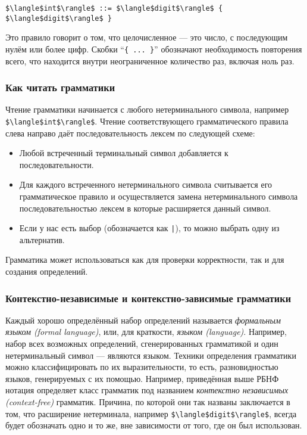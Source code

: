 \begin{lstlisting}
$\langle$int$\rangle$ ::= $\langle$digit$\rangle$ { $\langle$digit$\rangle$ }
\end{lstlisting}

Это правило говорит о том, что целочисленное --- это число, с последующим нулём или более цифр. Скобки ``\lstinline|{ ... }|'' обозначают необходимость повторения всего, что находится внутри неограниченное количество раз, включая ноль раз.

\subsubsection{Как читать грамматики}

Чтение грамматики начинается с любого нетерминального символа, например \lstinline|$\langle$int$\rangle$|. Чтение соответствующего грамматического правила слева направо даёт последовательность лексем по следующей схеме:

\begin{itemize}
\item{Любой встреченный терминальный символ добавляется к последовательности.}

\item{Для каждого встреченного нетерминального символа считывается его грамматическое правило и осуществляется замена нетерминального символа последовательностью лексем в которые расширяется данный символ.}

\item{Если у нас есть выбор (обозначается как \lstinline!|!), то можно выбрать одну из альтернатив.}
\end{itemize}

Грамматика может использоваться как для проверки корректности, так и для создания определений.

\subsubsection{Контекстно-независимые и контекстно-зависимые грамматики}

Каждый хорошо определённый набор определений называется \emph{формальным языком (formal language)}, или, для краткости, \emph{языком (language)}. Например, набор всех возможных определений, сгенерированных грамматикой и один нетерминальный символ --- являются языком. Техники определения грамматики можно классифицировать по их выразительности, то есть, разновидностью языков, генерируемых с их помощью. Например, приведённая выше РБНФ нотация определяет класс грамматик под названием \emph{контекстно независимых (context-free)} грамматик. Причина, по которой они так названы заключается в том, что расширение нетерминала, например \lstinline|$\langle$digit$\rangle$|, всегда будет обозначать одно и то же, вне зависимости от того, где он был использован.

